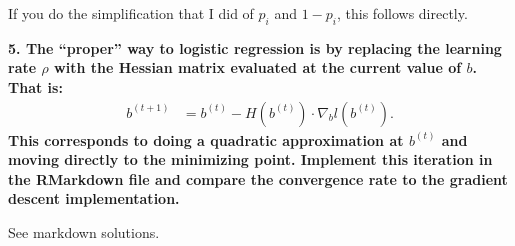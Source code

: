 \documentclass[12pt,hidelinks]{article}
\numberwithin{equation}{section}
\begin{document}
\vspace*{12pt}

If you do the simplification that I did of $p_i$ and $1 - p_i$, this follows
directly.

\vspace*{12pt}

\textbf{5. The ``proper'' way to logistic regression is by replacing the learning
rate $\rho$ with the Hessian matrix evaluated at the current value of $b$.
That is:}
\begin{align}
b^{(t+1)} &= b^{(t)} - H(b^{(t)}) \cdot \nabla_b l(b^{(t)}).
\end{align}
\textbf{This corresponds to doing a quadratic approximation at $b^{(t)}$ and moving
directly to the minimizing point. Implement this iteration in the RMarkdown
file and compare the convergence rate to the gradient descent implementation.}

\vspace*{12pt}

See markdown solutions.
\end{document}
